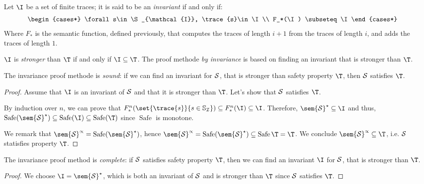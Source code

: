 \documentclass[toc]{../cs-classes/cs-classes}
\DeclareMathOperator{\safe}{Safe}
\begin{document}
\begin{definition}
    Let $\I$ be a set of finite traces; it is said to be an \emph{invariant} if and only if:
    \begin{equation*}
        \begin{cases*}
            \forall s\in\S_{\mathcal{I}}, \trace{s}\in\I\\
            F_*(\I) \subseteq\I
        \end{cases*}
    \end{equation*}
    Where $F_*$ is the semantic function, defined previously, that computes the traces of length $i+1$ from the traces of length $i$, and adds the traces of length $1$.

    $\I$ is \emph{stronger} than $\T$ if and only if $\I\subseteq\T$. The proof methode \emph{by invariance} is based on finding an invariant that is stronger than $\T$.
\end{definition}

\begin{theorem}
    The invariance proof methode is \emph{sound}: if we can find an invariant for $\mathcal{S}$, that is stronger than safety property $\T$, then $\mathcal{S}$ satisfies $\T$.
\end{theorem}
\begin{proof}
    Assume that $\I$ is an invariant of $\mathcal{S}$ and that it is stronger than $\T$. Let's show that $\mathcal{S}$ satisfies $\T$.

    By induction over $n$, we can prove that $F_*^n(\set{\trace{s}}{s\in\S_{\mathcal{I}}}) \subseteq F_*^n(\I) \subseteq \I$. Therefore, $\sem{\Sc}^\star \subseteq \I$ and thus, $\safe(\sem{\Sc}^\star)\subseteq\safe(\I)\subseteq\safe(\T)$ since $\safe$ is monotone.

    We remark that $\sem{\Sc}^\propto = \safe(\sem{\Sc}^\star)$, hence $\sem{\Sc}^\propto = \safe(\sem{\Sc}^\star) \subseteq \safe{\T} = \T$. We conclude $\sem{\Sc}^\propto \subseteq \T$, i.e. $\mathcal{S}$ statisfies property $\T$.
\end{proof}

\begin{theorem}
    The invariance proof method is \emph{complete}: if $\mathcal{S}$ satisfies safety property $\T$, then we can find an invariant $\I$ for $\mathcal{S}$, that is stronger than $\T$.    
\end{theorem}
\begin{proof}
    We choose $\I = \sem{\Sc}^\star$, which is both an invariant of $\mathcal{S}$ and is stronger than $\T$ since $\mathcal{S}$ satisfies $\T$.
\end{proof}
\end{document}
